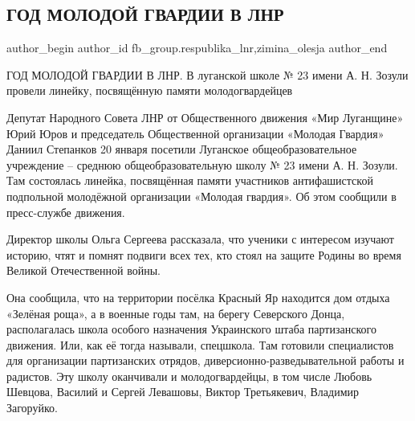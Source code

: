  
 
 
 
 
 
\subsection{ГОД МОЛОДОЙ ГВАРДИИ В ЛНР}
\label{sec:20_01_2022.fb.fb_group.respublika_lnr.1.god_molodoj_gvardii_lnr}
 
\ifcmt
 author_begin
   author_id fb_group.respublika_lnr,zimina_olesja
 author_end
\fi

ГОД МОЛОДОЙ ГВАРДИИ В ЛНР. В луганской школе № 23 имени А. Н. Зозули провели
линейку, посвящённую памяти молодогвардейцев

Депутат Народного Совета ЛНР от Общественного движения «Мир Луганщине» Юрий
Юров и председатель Общественной организации «Молодая Гвардия» Даниил Степанков
20 января посетили Луганское общеобразовательное учреждение – среднюю
общеобразовательную школу № 23 имени А. Н. Зозули. Там состоялась линейка,
посвящённая памяти участников антифашистской подпольной молодёжной организации
«Молодая гвардия». Об этом сообщили в пресс-службе движения.


Директор школы Ольга Сергеева рассказала, что ученики с интересом изучают
историю, чтят и помнят подвиги всех тех, кто стоял на защите Родины во время
Великой Отечественной войны.


Она сообщила, что на территории посёлка Красный Яр находится дом отдыха
«Зелёная роща», а в военные годы там, на берегу Северского Донца, располагалась
школа особого назначения Украинского штаба партизанского движения. Или, как её
тогда называли, спецшкола. Там готовили специалистов для организации
партизанских отрядов, диверсионно-разведывательной работы и радистов. Эту школу
оканчивали и молодогвардейцы, в том числе Любовь Шевцова, Василий и Сергей
Левашовы, Виктор Третьякевич, Владимир Загоруйко.

